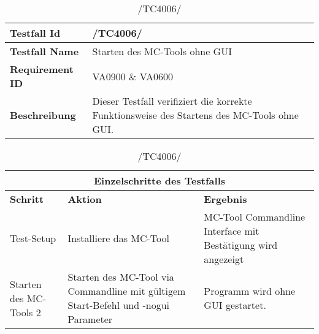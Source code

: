 \begin{table}[h]
\caption{/TC4006/}
\label{tab:TC4006}
\begin{center}
\begin{tabular}{|p{3.5cm}|p{9cm}|}
\hline
\textbf{Testfall Id} & /TC4006/\\
\hline
\textbf{Testfall Name} & Starten des MC-Tools ohne GUI\\
\hline
\textbf{Requirement ID} & VA0900 \& VA0600\\
\hline
\textbf{Beschreibung} & Dieser Testfall verifiziert die korrekte
Funktionsweise des Startens des MC-Tools ohne GUI.\\
\hline
\end{tabular}
\begin{tabular}{|p{2.5cm}|p{5cm}|p{4.55cm}|}
\multicolumn{3}{|c|}{\textbf{Einzelschritte des Testfalls}} \\
\hline
\textbf{Schritt} & \textbf{Aktion} & \textbf{Ergebnis}\\
\hline
Test-Setup & Installiere das MC-Tool & MC-Tool Commandline Interface mit Bestätigung wird angezeigt\\
\hline
Starten des MC-Tools 2 & Starten des MC-Tool via Commandline mit gültigem
Start-Befehl und -nogui Parameter & Programm wird ohne GUI gestartet.\\
\hline
\end{tabular}
\end{center}
\label{default}
\end{table}